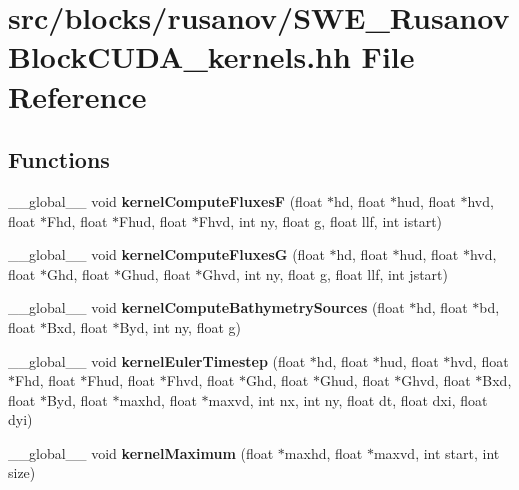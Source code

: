 \section{src/blocks/rusanov/\-S\-W\-E\-\_\-\-Rusanov\-Block\-C\-U\-D\-A\-\_\-kernels.hh File Reference}
\label{SWE__RusanovBlockCUDA__kernels_8hh}
\subsection*{Functions}
\begin{DoxyCompactItemize}
\item 
\-\_\-\-\_\-global\-\_\-\-\_\- void {\bfseries kernel\-Compute\-Fluxes\-F} (float $\ast$hd, float $\ast$hud, float $\ast$hvd, float $\ast$Fhd, float $\ast$Fhud, float $\ast$Fhvd, int ny, float g, float llf, int istart)\label{SWE__RusanovBlockCUDA__kernels_8hh_a125f373796424316bc49a0eb60f5f90e}

\item 
\-\_\-\-\_\-global\-\_\-\-\_\- void {\bfseries kernel\-Compute\-Fluxes\-G} (float $\ast$hd, float $\ast$hud, float $\ast$hvd, float $\ast$Ghd, float $\ast$Ghud, float $\ast$Ghvd, int ny, float g, float llf, int jstart)\label{SWE__RusanovBlockCUDA__kernels_8hh_a4a5d67e82c837347e337904d4c17cc07}

\item 
\-\_\-\-\_\-global\-\_\-\-\_\- void {\bfseries kernel\-Compute\-Bathymetry\-Sources} (float $\ast$hd, float $\ast$bd, float $\ast$Bxd, float $\ast$Byd, int ny, float g)\label{SWE__RusanovBlockCUDA__kernels_8hh_aa7530530448af30119436099351cfead}

\item 
\-\_\-\-\_\-global\-\_\-\-\_\- void {\bfseries kernel\-Euler\-Timestep} (float $\ast$hd, float $\ast$hud, float $\ast$hvd, float $\ast$Fhd, float $\ast$Fhud, float $\ast$Fhvd, float $\ast$Ghd, float $\ast$Ghud, float $\ast$Ghvd, float $\ast$Bxd, float $\ast$Byd, float $\ast$maxhd, float $\ast$maxvd, int nx, int ny, float dt, float dxi, float dyi)\label{SWE__RusanovBlockCUDA__kernels_8hh_a105ff13519fe40ec2acbc182d5584a07}

\item 
\-\_\-\-\_\-global\-\_\-\-\_\- void {\bfseries kernel\-Maximum} (float $\ast$maxhd, float $\ast$maxvd, int start, int size)\label{SWE__RusanovBlockCUDA__kernels_8hh_ae810017f0a27a38e1c5d78c7130e8ab4}

\end{DoxyCompactItemize}


